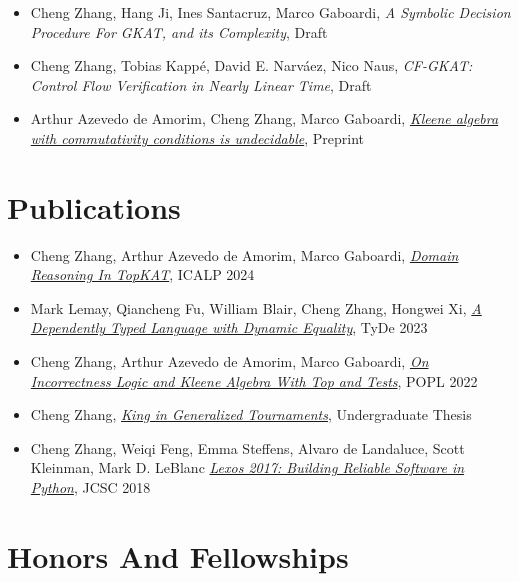 \begin{itemize}
    \item 
    Cheng Zhang, Hang Ji, Ines Santacruz, Marco Gaboardi, 
    \emph{A Symbolic Decision Procedure For GKAT, and its Complexity}, Draft

    \item 
    Cheng Zhang, Tobias Kappé, David E. Narváez, Nico Naus,
    \emph{CF-GKAT: Control Flow Verification in Nearly Linear Time}, Draft

    \item 
    Arthur Azevedo de Amorim, Cheng Zhang, Marco Gaboardi,
    \emph{\href{https://hal.science/hal-04534715/}{Kleene algebra with commutativity conditions is undecidable}}, Preprint
\end{itemize}

\section*{Publications}

\begin{itemize}
    \item 
    Cheng Zhang, Arthur Azevedo de Amorim, Marco Gaboardi,
    \emph{\href{https://arxiv.org/abs/2404.18417}{Domain Reasoning In TopKAT}}, ICALP 2024
    
    \item 
    Mark Lemay, Qiancheng Fu, William Blair, Cheng Zhang, Hongwei Xi,
    \emph{\href{https://doi.org/10.1145/3609027.3609407}{A Dependently Typed Language with Dynamic Equality}}, TyDe 2023

    \item 
    Cheng Zhang, Arthur Azevedo de Amorim, Marco Gaboardi,
    \emph{\href{https://arxiv.org/abs/2108.07707}{On Incorrectness Logic and Kleene Algebra With Top and Tests}}, POPL 2022

    \item 
    Cheng Zhang, \emph{\href{http://hdl.handle.net/11040/24570}{King in Generalized Tournaments}}, Undergraduate Thesis 

    \item 
    Cheng Zhang, Weiqi Feng, Emma Steffens, Alvaro de Landaluce, Scott Kleinman, Mark D. LeBlanc
    \emph{\href{https://dl.acm.org/doi/10.5555/3205191.3205205}{Lexos 2017: Building Reliable Software in Python}}, JCSC 2018
\end{itemize}


\section*{Honors And Fellowships}

